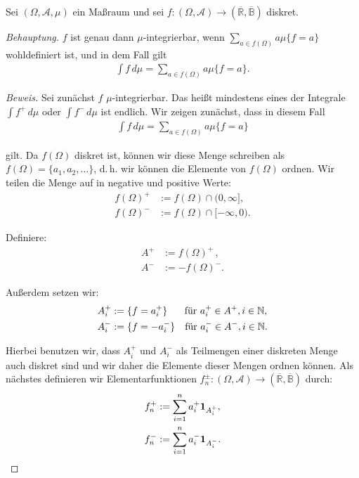 \documentclass[10pt]{article}
\newcommand{\R}{\mathbb{R}}
\newcommand{\N}{\mathbb{N}}
\newcommand{\beh}{\textit{Behauptung. }}
\newenvironment{Aufgabe}[2][Aufgabe]{\begin{trivlist}
\item[\hskip \labelsep {\bfseries #1}\hskip \labelsep {\bfseries #2.}]}{\end{trivlist}}
\begin{document}

	\begin{Aufgabe}{2}
		Sei $(\Omega,\mathcal{A},\mu)$ ein Maßraum und sei $f: (\Omega,\mathcal{A})\to (\overline{\R} , \overline{\mathbb{B}})$
		diskret. 
	\end{Aufgabe}

	\beh $f$ ist genau dann $\mu$-integrierbar, wenn $\sum_{a\in f(\Omega)} a\mu\{f=a\}$ 
	wohldefiniert ist, und in dem Fall gilt 
	\begin{align*}
		\int f \,d\mu = \sum_{a\in f(\Omega)} a\mu\{f=a\}.
	\end{align*}
	\begin{proof}[Beweis]
		Sei zunächst $f$ $\mu$-integrierbar. Das heißt mindestens eines der Integrale 
		$\int f^{+} \,d\mu$ oder $\int f^{-} \,d\mu$ ist endlich.
		Wir zeigen zunächst, dass in diesem Fall
		\begin{align*}
			\int f \,d\mu = \sum_{a\in f(\Omega)} a\mu\{f=a\}
		\end{align*}

		gilt. Da $f(\Omega)$ diskret ist, können wir diese Menge schreiben als 
		$f(\Omega) = \{ a_1,a_2,\dots \}$, d.\,h. wir können die Elemente von $f(\Omega)$  
		ordnen. Wir teilen die Menge auf in negative und positive Werte:
		\begin{align*}
			f(\Omega)^{+} &:= f(\Omega)\cap(0,\infty], \\
			f(\Omega)^{-} &:= f(\Omega)\cap[-\infty,0).
		\end{align*}

		Definiere:
		\begin{align*}
			A^{+} &:= f(\Omega)^{+} \,,  \\
			A^{-} &:= -f(\Omega)^{-}.
		\end{align*}

		Außerdem setzen wir:
		\begin{align*}
			A_i^{+} &:= \{ f = a_i^+ \} \quad\text{\hspace{0.15cm} für $a_i^+\in A^+, i\in\N$}, \\
			A_i^{-} &:= \{ f = -a_i^- \} \quad\text{für $a_i^-\in A^-, i\in\N$}.
		\end{align*}

		Hierbei benutzen wir, dass $A_i^{+}$ und $A_i^{-}$ als Teilmengen einer diskreten Menge 
		auch diskret sind und wir daher die Elemente dieser Mengen ordnen können.  
		Als nächstes definieren wir Elementarfunktionen $f_n^\pm : (\Omega,\mathcal{A})\to (\overline{\R} , \overline{\mathbb{B}})$ durch:
		\begin{align*}
			f^{+}_n &:= \sum_{i=1}^{n} a_i^+ \text{\textbf{1}}_{A^{+}_i}, \\															   
			f^{-}_n &:= \sum_{i=1}^{n} a_i^- \text{\textbf{1}}_{A^{-}_i}.								   
		\end{align*}


\end{proof}
\end{document}
